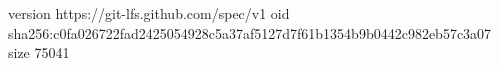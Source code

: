 version https://git-lfs.github.com/spec/v1
oid sha256:c0fa026722fad2425054928c5a37af5127d7f61b1354b9b0442c982eb57c3a07
size 75041

